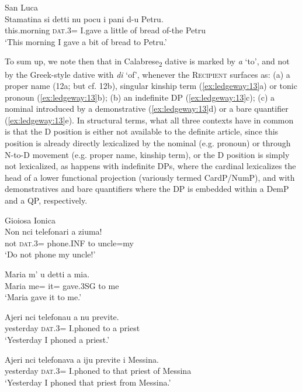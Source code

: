 \documentclass[output=paper,modfonts,nonflat,colorlinks,citecolor=brown]{langsci/langscibook}
\begin{document}
\ex San Luca\\
 \gll Stamatina        si          detti  nu  pocu   i   pani   d-u   Petru.\\
        this.morning   \textsc{dat}.3=  I.gave   a  little   of   bread   of-the   Petru\\
        \glt `This morning I gave a bit of bread to Petru.'
        \z
        \z

To sum up, we note then that in Calabrese\textsubscript{2} dative is marked by \textit{a} ‘to’, and not by the Greek-style dative with \textit{di} ‘of’, whenever the \textsc{Recipient} surfaces as: (a) a proper name (12a; but cf. 12b), singular kinship term (\ref{ex:ledgeway:13}a) or tonic pronoun (\ref{ex:ledgeway:13}b); (b) an indefinite DP (\ref{ex:ledgeway:13}c); (c) a nominal introduced by a demonstrative (\ref{ex:ledgeway:13}d) or a bare quantifier (\ref{ex:ledgeway:13}e). In structural terms, what all three contexts have in common is that the D position is either not available to the definite article, since this position is already directly lexicalized by the nominal (e.g. pronoun) or through N-to-D movement (e.g. proper name, kinship term), or the D position is simply not lexicalized, as happens with indefinite DPs, where the cardinal lexicalizes the head of a lower functional projection (variously termed CardP/NumP), and with demonstratives and bare quantifiers where the DP is embedded within a DemP and a QP, respectively. 

\ea\label{ex:ledgeway:13}
  Gioiosa Ionica\\
\ea
	\gll Non  nci  telefonari  a  ziuma!\\
      not  \textsc{dat}.3=  phone.INF   to  uncle=my\\
      \glt `Do not phone my uncle!'

\ex
	\gll Maria  m’  u  detti  a  mia.\\
    Maria  me=  it=  gave.3SG   to  me\\
    \glt `Maria gave it to me.'

\ex
	\gll Ajeri  nci  telefonau  a  nu   previte.\\
      yesterday  \textsc{dat}.3=  I.phoned  to  a  priest \\
      \glt `Yesterday I phoned a priest.'

\ex
	\gll Ajeri  nci   telefonava  a  iju    previte   i   Messina.\\
      yesterday  \textsc{dat}.3=  I.phoned  to  that   priest   of   Messina\\
      \glt `Yesterday I phoned that priest from Messina.'
\end{document}
